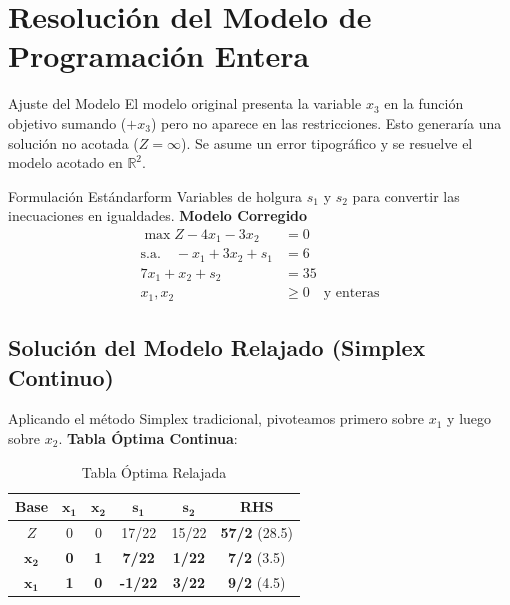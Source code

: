 \documentclass[10pt,a4paper]{article}
\begin{document}
\newpage

\section{Resolución del Modelo de Programación Entera}

\begin{alerta}{Ajuste del Modelo}
El modelo original presenta la variable $x_3$ en la función objetivo sumando ($+x_3$)
pero no aparece en las restricciones.
Esto generaría una solución no acotada ($Z = \infty$). 
Se  asume un error tipográfico y se resuelve el modelo acotado en $\mathbb{R}^2$.
\end{alerta}

\begin{ejercicio}{Formulación Estándar}{form}
Variables de holgura $s_1$ y $s_2$ para convertir las inecuaciones en igualdades.
\textbf{Modelo Corregido}
\begin{align*}
    \max Z - 4x_1 - 3x_2 &= 0 \\
    \text{s.a.} \quad -x_1 + 3x_2 + s_1 &= 6 \\
    7x_1 + x_2 + s_2 &= 35 \\
    x_1, x_2 &\geq 0 \quad \text{y enteras}
\end{align*}
\end{ejercicio}

\subsection{Solución del Modelo Relajado (Simplex Continuo)}

Aplicando el método Simplex tradicional, 
pivoteamos primero sobre $x_1$ y luego sobre $x_2$. 
\textbf{Tabla Óptima Continua}:

\begin{table}[H]
    \centering
    \begin{tabular}{c c c c c | c}
    \toprule
    \textbf{Base} & $\mathbf{x_1}$ & $\mathbf{x_2}$ & $\mathbf{s_1}$ & $\mathbf{s_2}$ & \textbf{RHS} \\
    \midrule
    $Z$   & 0 & 0 & 17/22 & 15/22 & \textbf{57/2} (28.5) \\
    $\mathbf{x_2}$ & \textbf{0} & \textbf{1} & \textbf{7/22} & \textbf{1/22} & \textbf{7/2} (3.5) \\
    $\mathbf{x_1}$ & \textbf{1} & \textbf{0} & \textbf{-1/22} & \textbf{3/22} & \textbf{9/2} (4.5) \\
    \bottomrule
    \end{tabular}
    \caption{Tabla Óptima Relajada}
\end{table}
\end{document}
